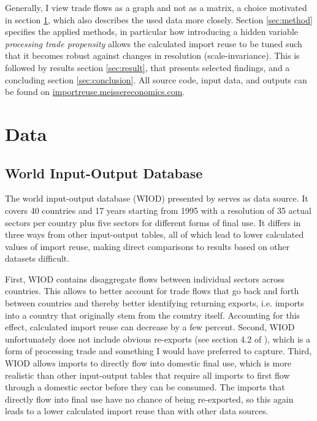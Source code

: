 \documentclass[english]{uzhpub}
\begin{document}
Generally, I view trade flows as a graph and not as a matrix, a choice motivated in section \ref{sec:data}, which also describes the used data more closely. Section \ref{sec:method} specifies the applied methods, in particular how introducing a hidden variable \emph{processing trade propensity} allows the calculated import reuse to be tuned such that it becomes robust against changes in resolution (scale-invariance). This is followed by results section \ref{sec:result}, that presents selected findings, and a concluding section \ref{sec:conclusion}. All source code, input data, and outputs can be found on \href{http://importreuse.meissereconomics.com}{importreuse.meissereconomics.com}.

\section{Data} \label{sec:data}
\subsection{World Input-Output Database}
The world input-output database (WIOD) presented by \cite{timmer2012world} serves as data source. It covers 40 countries and 17 years starting from 1995 with a resolution of 35 actual sectors per country plus five sectors for different forms of final use. It differs in three ways from other input-output tables, all of which lead to lower calculated values of import reuse, making direct comparisons to results based on other datasets difficult.

First, WIOD contains disaggregate flows between individual sectors across countries. This allows to better account for trade flows that go back and forth between countries and thereby better identifying returning exports, i.e. imports into a country that originally stem from the country itself. Accounting for this effect, calculated import reuse can decrease by a few percent. Second, WIOD unfortunately does not include obvious re-exports (see section 4.2 of \cite{dietzenbacher2013construction}), which is a form of processing trade and something I would have preferred to capture. Third, WIOD allows imports to directly flow into domestic final use, which is more realistic than other input-output tables that require all imports to first flow through a domestic sector before they can be consumed. The imports that directly flow into final use have no chance of being re-exported, so this again leads to a lower calculated import reuse than with other data sources.
\end{document}
